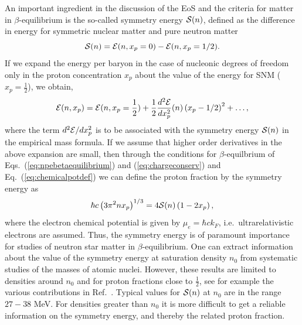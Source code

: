 An important ingredient in the discussion of the EoS and the criteria
for matter in $\beta$-equilibrium is the so-called symmetry energy
${\cal S} (n)$, defined as the difference in energy for symmetric
nuclear matter and pure neutron matter
\begin{equation}
      {\cal S} (n) = {\cal E} (n,x_p=0) - {\cal E} (n,x_p=1/2 ).
      \label{eq:symenergy}
\end{equation}
If we expand the energy per baryon in the case of nucleonic degrees of
freedom only in the proton concentration $x_p$ about the value of the
energy for SNM ($x_p=\frac{1}{2}$), we obtain,
\begin{equation}
     {\cal E} (n,x_p)={\cal E} (n,x_p=\frac{1}{2})+
     \frac{1}{2}\frac{d^2 {\cal E}}{dx_p^2}
     (n)\left(x_p-1/2\right)^2+\dots ,
     \label{eq:energyexpansion}
\end{equation}
where the term $d^2 {\cal E}/dx_p^2$ is to be associated with the
symmetry energy ${\cal S} (n)$ in the empirical mass formula. If we
assume that higher order derivatives in the above expansion are small,
then through the conditions for $\beta$-equilbrium of
Eqs.~(\ref{eq:npebetaequilibrium}) and (\ref{eq:chargeconserv}) and
Eq.~(\ref{eq:chemicalpotdef}) we can define the proton fraction by the
symmetry energy as
\begin{equation}  
    \hbar c\left(3\pi^2nx_p\right)^{1/3} = 4{\cal S}
    (n)\left(1-2x_p\right),
    \label{eq:crudeprotonfraction}
\end{equation}
where the electron chemical potential is given by $\mu_e = \hbar c
k_F$, i.e.\ ultrarelativistic electrons are assumed.  Thus, the
symmetry energy is of paramount importance for studies of neutron star
matter in $\beta$-equilibrium.  One can extract information about the
value of the symmetry energy at saturation density $n_0$ from
systematic studies of the masses of atomic nuclei. However, these
results are limited to densities around $n_0$ and for proton fractions
close to $\frac{1}{2}$, see for example the various contributions in
Ref.~\cite{symmetryenergy2013}.  Typical values for ${\cal S} (n)$ at
$n_0$ are in the range $27-38$ MeV.  For densities greater than $n_0$
it is more difficult to get a reliable information on the symmetry
energy, and thereby the related proton fraction.


